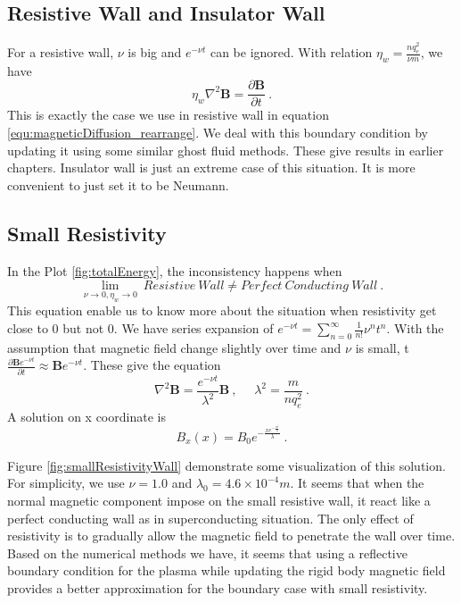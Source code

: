 \subsection*{Resistive Wall and Insulator Wall}
For a resistive wall, $\nu$ is big and $e^{-\nu t}$ can be ignored. With relation $\eta_w=\frac{nq_e^2}{\nu m}$, we have 
$$
\eta_{w}\nabla^2\mathbf{B}=\frac{\partial \mathbf{B}}{\partial t}\ .
$$
This is exactly the case we use in resistive wall in equation \ref{equ:magneticDiffusion_rearrange}. We deal with this boundary condition by updating it using some similar ghost fluid methods. These give results in earlier chapters. Insulator wall is just an extreme case of this situation. It is more convenient to just set it to be Neumann.

\subsection*{Small Resistivity}
In the Plot \ref{fig:totalEnergy}, the inconsistency happens when 
$$
\lim_{\nu \to 0,\eta_w \to 0}\ Resistive\ Wall \neq Perfect\ Conducting\ Wall\ .
$$
This equation enable us to know more about the situation when resistivity get close to 0 but not 0. We have series expansion of $e^{-\nu t}=\sum_{n=0}^{\infty}\frac{1}{n!}\nu^nt^n$. With the assumption that magnetic field change slightly over time and $\nu$ is small, t$\frac{\partial \mathbf{B}e^{-\nu t}}{\partial t}\approx\mathbf{B}e^{-\nu t}$. These give the equation 
\begin{equation*}
	\nabla^2\mathbf{B}=\frac{e^{-\nu t}}{\lambda^2}\mathbf{B}\ ,\ \ \ \ \ \  \lambda^2=\frac{m}{n q_e^2}\ .
\end{equation*}
A solution on x coordinate is
\begin{equation}
	B_x(x)=B_0e^{-\frac{xe^{-\frac{\nu t}{2}}}{\lambda}}\ .
\end{equation}

Figure \ref{fig:smallResistivityWall} demonstrate some visualization of this solution. For simplicity, we use $\nu=1.0$ and $\lambda_{0}=4.6\times10^{-4}m$. It seems that when the normal magnetic component impose on the small resistive wall, it react like a perfect conducting wall as in superconducting situation. The only effect of resistivity is to gradually allow the magnetic field to penetrate the wall over time. Based on the numerical methods we have, it seems that using a reflective boundary condition for the plasma while updating the rigid body magnetic field provides a better approximation for the boundary case with small resistivity.  

